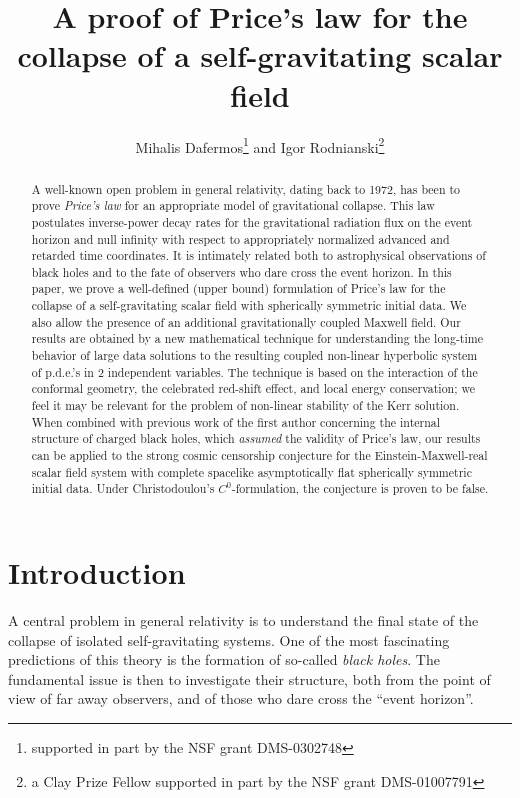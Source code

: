 \documentclass{article}
\begin{document}
\author{\sc Mihalis Dafermos\footnote{supported in part by
the NSF grant DMS-0302748} and Igor Rodnianski\footnote{a Clay Prize
Fellow supported in part by the NSF grant DMS-01007791}}
\title{A proof of Price's law for the collapse
of a self-gravitating scalar field}
\maketitle
\begin{abstract}
A well-known open problem in general relativity, dating back to 1972, 
has been to prove \emph{Price's law} for an appropriate model 
of gravitational collapse. This law postulates 
inverse-power decay rates
for the gravitational radiation flux on the event horizon
and null infinity with respect to appropriately normalized
advanced and retarded time coordinates. It is intimately
related both to astrophysical observations of black holes
and to the fate of observers who dare cross the event horizon.
In this paper, we prove a well-defined (upper bound) formulation
of Price's law for the collapse of a self-gravitating scalar field
with spherically symmetric initial data. We also allow
the presence of an additional gravitationally coupled Maxwell field. 
Our results are obtained by a new mathematical technique
for understanding the long-time behavior of large data solutions to the resulting coupled non-linear
hyperbolic system of p.d.e.'s in $2$ independent variables.
The technique is based on the interaction of the conformal geometry, the celebrated red-shift
effect, and local energy conservation; we feel
it may be relevant for the problem of non-linear stability of
the Kerr solution. When combined with previous work of the first author concerning
the internal structure of charged black holes, which \emph{assumed}
the validity of Price's law, our results can be applied to the strong cosmic censorship
conjecture for the Einstein-Maxwell-real scalar field system
with complete spacelike asymptotically flat spherically symmetric 
initial data. Under Christodoulou's $C^0$-formulation, 
the conjecture is proven to be false. 
\end{abstract}
\tableofcontents
\section{Introduction}
A central problem in general relativity is to understand
the final state of the collapse of isolated self-gravitating systems. 
One of the most
fascinating predictions of this theory is the formation of 
so-called \emph{black holes}. The fundamental issue is then 
to investigate their structure, both from the point of view
of far away observers, and of those
who dare cross the ``event horizon''.
\end{document}
